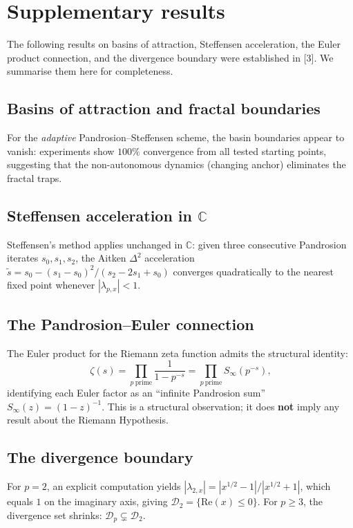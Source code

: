 \documentclass[11pt,a4paper]{article}
\begin{document}
\section{Supplementary results}

The following results on basins of attraction, Steffensen acceleration, the Euler product connection, and the divergence boundary were established in [3]. We summarise them here for completeness.

\subsection{Basins of attraction and fractal boundaries}

For the \emph{adaptive} Pandrosion--Steffensen scheme, the basin boundaries appear to vanish: experiments show $100\%$ convergence from all tested starting points, suggesting that the non-autonomous dynamics (changing anchor) eliminates the fractal traps.

\subsection{Steffensen acceleration in $\mathbb{C}$}

Steffensen's method applies unchanged in $\mathbb{C}$: given three consecutive Pandrosion iterates $s_0, s_1, s_2$, the Aitken $\Delta^2$ acceleration $\tilde{s} = s_0 - (s_1 - s_0)^2/(s_2 - 2 s_1 + s_0)$ converges quadratically to the nearest fixed point whenever $|\lambda_{p,x}| < 1$.

\subsection{The Pandrosion--Euler connection}

The Euler product for the Riemann zeta function admits the structural identity:
$$ \zeta(s) = \prod_{p \mathrm{\ prime}} \frac{1}{1 - p^{-s}} = \prod_{p \mathrm{\ prime}} S_\infty(p^{-s}), $$
identifying each Euler factor as an ``infinite Pandrosion sum'' $S_\infty(z) = (1 - z)^{-1}$. This is a structural observation; it does \textbf{not} imply any result about the Riemann Hypothesis.

\subsection{The divergence boundary}

For $p = 2$, an explicit computation yields $|\lambda_{2,x}| = |x^{1/2} - 1|/|x^{1/2} + 1|$, which equals $1$ on the imaginary axis, giving $\mathcal{D}_2 = \{\mathrm{Re}(x) \le 0\}$. For $p \ge 3$, the divergence set shrinks: $\mathcal{D}_p \subsetneq \mathcal{D}_2$.
\end{document}
